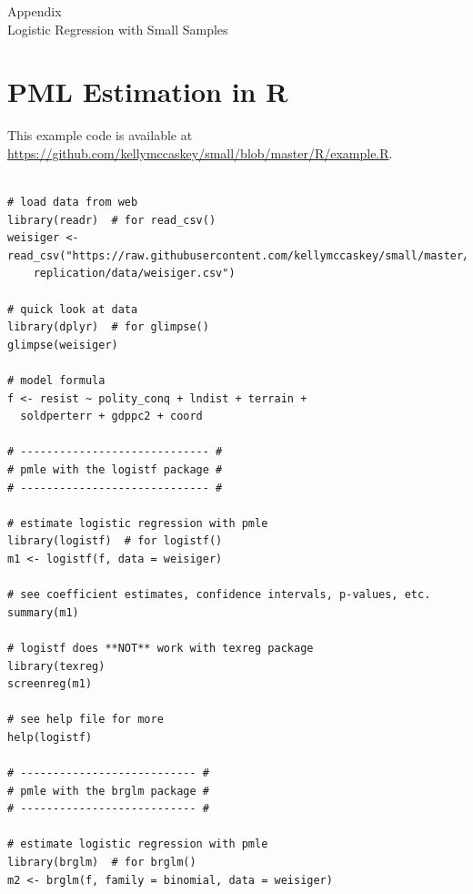 \documentclass[12pt]{article}
\begin{document}
\singlespace 
\normalsize


%

\newpage
\begin{appendix}
\begin{center}
{\LARGE Appendix}\\
\vspace{3mm}
{\large Logistic Regression with Small Samples}\\\vspace{2mm}
\end{center}

\section{PML Estimation in R}\label{sec:pmle-in-R}

This example code is available at \href{https://github.com/kellymccaskey/small/blob/master/R/example.R}{https://github.com/kellymccaskey/small/blob/master/R/example.R}.

\begin{footnotesize}
\begin{verbatim}

# load data from web
library(readr)  # for read_csv()
weisiger <- read_csv("https://raw.githubusercontent.com/kellymccaskey/small/master/weisiger-
	replication/data/weisiger.csv") 

# quick look at data
library(dplyr)  # for glimpse()
glimpse(weisiger)

# model formula
f <- resist ~ polity_conq + lndist + terrain + 
  soldperterr + gdppc2 + coord

# ----------------------------- #
# pmle with the logistf package #
# ----------------------------- #

# estimate logistic regression with pmle
library(logistf)  # for logistf()
m1 <- logistf(f, data = weisiger)

# see coefficient estimates, confidence intervals, p-values, etc.
summary(m1)

# logistf does **NOT** work with texreg package
library(texreg)
screenreg(m1)

# see help file for more
help(logistf)

# --------------------------- #
# pmle with the brglm package #
# --------------------------- #

# estimate logistic regression with pmle
library(brglm)  # for brglm()
m2 <- brglm(f, family = binomial, data = weisiger)


\end{verbatim}
\end{footnotesize}
\end{appendix}
\end{document}
